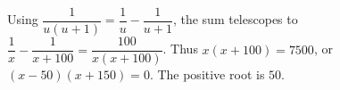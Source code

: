 Using $\dfrac{1}{u(u+1)}=\dfrac{1}{u}-\dfrac{1}{u+1}$, the sum telescopes to $\dfrac{1}{x}-\dfrac{1}{x+100}=\dfrac{100}{x(x+100)}$. Thus $x(x+100)=7500$, or $(x-50)(x+150)=0$. The positive root is $\boxed{50}$.
